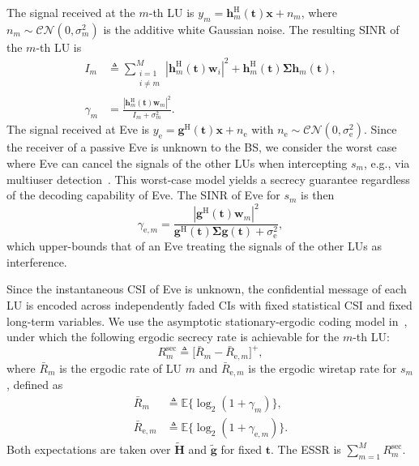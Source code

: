 \documentclass[journal]{IEEEtran}
\newcommand{\E}{\mathbb{E}}
\newcommand{\CN}{\mathcal{CN}}
\newcommand{\bt}{\mathbf{t}}
\newcommand{\bh}{\mathbf{h}}
\newcommand{\bg}{\mathbf{g}}
\newcommand{\gtl}{\tilde{\mathbf{g}}}
\newcommand{\Htl}{\tilde{\mathbf{H}}}
\newcommand{\bw}{\mathbf{w}}
\newcommand{\bx}{\mathbf{x}}
\newcommand{\bSig}{\boldsymbol{\Sigma}}
\begin{document}
The signal received at the $m$-th LU is $y_m=\bh_m^{\mathrm{H}}(\bt)\bx+n_m$, where $n_m\sim\CN(0,\sigma_m^2)$ is the additive white Gaussian noise. The resulting SINR of the $m$-th LU is
\begin{align}
I_m&\triangleq\sum_{\substack{i=1\\ i\neq m}}^{M}
 |\bh_m^{\mathrm{H}}(\bt)\bw_i|^2
 +\bh_m^{\mathrm{H}}(\bt)\bSig\bh_m(\bt),\nonumber\\
\gamma_m&=\frac{|\bh_m^{\mathrm{H}}(\bt)\bw_m|^2}{I_m+\sigma_m^2}.
\label{eq:sinr_gen}
\end{align}
The signal received at Eve is $y_{\mathrm{e}}=\bg^{\mathrm{H}}(\bt)\bx+n_{\mathrm{e}}$ with $n_{\mathrm{e}}\sim\CN(0,\sigma_{\mathrm{e}}^2)$. Since the receiver of a passive Eve is unknown to the BS, we consider the worst case where Eve can cancel the signals of the other LUs when intercepting $s_m$, e.g., via multiuser detection~\cite{ZhuTWC2014}. This worst-case model yields a secrecy guarantee regardless of the decoding capability of Eve. The SINR of Eve for $s_m$ is then
\begin{equation}\label{eq:sinre_gen}
\gamma_{\mathrm{e},m}=\frac{|\bg^{\mathrm{H}}(\bt)\bw_m|^2}{\bg^{\mathrm{H}}(\bt)\bSig\bg(\bt)+\sigma_{\mathrm{e}}^2},
\end{equation}
which upper-bounds that of an Eve treating the signals of the other LUs as interference.

Since the instantaneous CSI of Eve is unknown, the confidential message of each LU is encoded across independently faded CIs with fixed statistical CSI and fixed long-term variables. We use the asymptotic stationary-ergodic coding model in~\cite{Gopala2008,ZhuTWC2014}, under which the following ergodic secrecy rate is achievable for the $m$-th LU:
\begin{equation}\label{eq:esr}
R_m^{\mathrm{sec}}\triangleq\big[\bar R_m-\bar R_{\mathrm{e},m}\big]^+,
\end{equation}
where $\bar R_m$ is the ergodic rate of LU $m$ and $\bar R_{\mathrm{e},m}$ is the ergodic wiretap rate for $s_m$, defined as
\begin{equation}\label{eq:ergodic}
\begin{aligned}
\bar R_m&\triangleq\E\{\log_2(1+\gamma_m)\},\\
\bar R_{\mathrm{e},m}&\triangleq\E\{\log_2(1+\gamma_{\mathrm{e},m})\}.
\end{aligned}
\end{equation}
Both expectations are taken over $\Htl$ and $\gtl$ for fixed $\bt$. The ESSR is $\sum_{m=1}^{M}R_m^{\mathrm{sec}}$.
\end{document}
